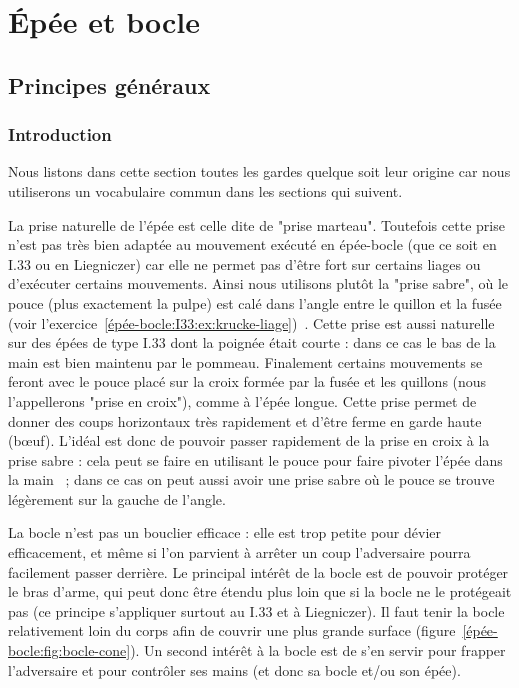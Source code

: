 \chapter{Épée et bocle}


\section{Principes généraux}


\subsection{Introduction}


Nous listons dans cette section toutes les gardes quelque soit leur origine car nous utiliserons un vocabulaire commun dans les sections qui suivent.

La prise naturelle de l'épée est celle dite de "prise marteau".
Toutefois cette prise n'est pas très bien adaptée au mouvement exécuté en épée-bocle (que ce soit en I.33 ou en Liegniczer) car elle ne permet pas d'être fort sur certains liages ou d'exécuter certains mouvements.
Ainsi nous utilisons plutôt la "prise sabre", où le pouce (plus exactement la pulpe) est calé dans l'angle entre le quillon et la fusée (voir l'exercice~\ref{épée-bocle:I33:ex:krucke-liage})~\cite{fuhrmann:dijon:I33_liage:2015}.
Cette prise est aussi naturelle sur des épées de type I.33 dont la poignée était courte : dans ce cas le bas de la main est bien maintenu par le pommeau.
Finalement certains mouvements se feront avec le pouce placé sur la croix formée par la fusée et les quillons (nous l'appellerons "prise en croix"), comme à l'épée longue.
Cette prise permet de donner des coups horizontaux très rapidement et d'être ferme en garde haute (bœuf).
L'idéal est donc de pouvoir passer rapidement de la prise en croix à la prise sabre : cela peut se faire en utilisant le pouce pour faire pivoter l'épée dans la main~\footnotemark{} ; dans ce cas on peut aussi avoir une prise sabre où le pouce se trouve légèrement sur la gauche de l'angle.

La bocle n'est pas un bouclier efficace : elle est trop petite pour dévier efficacement, et même si l'on parvient à arrêter un coup l'adversaire pourra facilement passer derrière.
Le principal intérêt de la bocle est de pouvoir protéger le bras d'arme, qui peut donc être étendu plus loin que si la bocle ne le protégeait pas (ce principe s'appliquer surtout au I.33 et à Liegniczer).
Il faut tenir la bocle relativement loin du corps afin de couvrir une plus grande surface (figure~\ref{épée-bocle:fig:bocle-cone}).
Un second intérêt à la bocle est de s'en servir pour frapper l'adversaire et pour contrôler ses mains (et donc sa bocle et/ou son épée).

